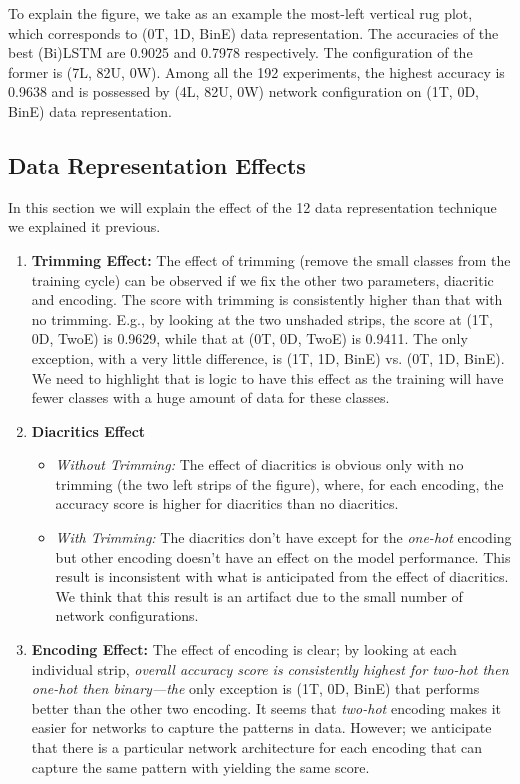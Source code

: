 To explain the figure, we take as an example the most-left vertical rug plot, which corresponds to (0T, 1D, BinE) data representation. The accuracies of the best (Bi)LSTM are 0.9025 and 0.7978 respectively. The configuration of the former is (7L, 82U, 0W). Among all the 192 experiments, the highest accuracy is 0.9638 and is possessed by (4L, 82U, 0W) network configuration on (1T, 0D, BinE) data representation.

\subsection{Data Representation Effects}

In this section we will explain the effect of the 12 data representation technique we explained it previous.

\begin{enumerate}
  \item \textbf{Trimming Effect:} The effect of trimming (remove the small classes from the training cycle) can be observed if we fix the other two parameters, diacritic and encoding. The score with trimming is consistently higher than that with no trimming. E.g., by looking at the two unshaded strips, the score at (1T, 0D, TwoE) is 0.9629, while that at (0T, 0D, TwoE) is 0.9411. The only exception, with a very little difference, is (1T, 1D, BinE) vs. (0T, 1D, BinE). We need to highlight that is logic to have this effect as the training will have fewer classes with a huge amount of data for these classes.
  \item \textbf{Diacritics Effect}
  \begin{itemize}
    \item \textit{Without Trimming:} The effect of diacritics is obvious only with no trimming (the two left strips of the figure), where, for each encoding, the accuracy score is higher for diacritics than no diacritics.
    \item \textit{With Trimming:} The diacritics don't have except for the \textit{\textit{one-hot}} encoding but other encoding doesn't have an effect on the model performance. This result is inconsistent with what is anticipated from the effect of diacritics. We think that this result is an artifact due to the small number of network configurations.

  \end{itemize} 
  \item \textbf{Encoding Effect:} The effect of encoding is clear; by looking at each individual strip, \textit{overall accuracy score is consistently highest for \textit{two-hot} then \textit{one-hot} then \textit{binary}—the} only exception is (1T, 0D, BinE) that performs better than the other two encoding. It seems that \textit{two-hot} encoding makes it easier for networks to capture the patterns in data. However; we anticipate that there is a particular network architecture for each encoding that can capture the same pattern with yielding the same score.
\end{enumerate}



